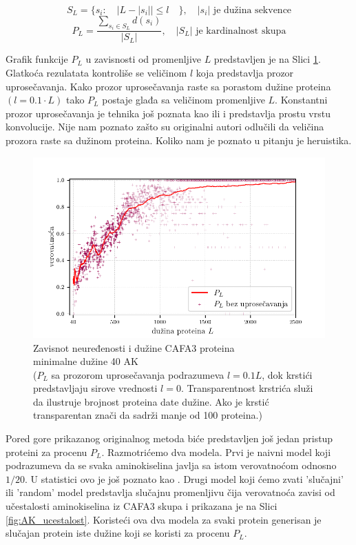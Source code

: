 $$ S_L = \{s_i : \quad | L -  | s_i | | \le l \quad \}, \quad   |s_i| \text{ je dužina sekvence}  $$
$$ P_L = \dfrac{ \sum_{s_i \in S_L} d(s_i)} {| S_L |}, \quad   |S_L| \text{ je kardinalnost skupa}$$

Grafik funkcije $P_L$ u zavisnosti od promenljive $L$ predstavljen je na Slici
\ref{fig:PL1}.  Glatkoća rezulatata kontroliše se veličinom $l$ koja
predstavlja prozor uprosečavanja. Kako prozor uprosečavanja raste sa porastom
dužine proteina $(l = 0.1 \cdot L)$ tako $P_L$ postaje glađa sa veličinom
promenljive $L$.  Konstantni prozor uprosečavanja je tehnika još poznata
kao  ili  i predstavlja prostu vrstu
konvolucije.  Nije nam poznato  zašto su originalni autori odlučili da veličina
prozora raste sa dužinom proteina. Koliko nam je poznato u pitanju je heruistika.


\begin{figure}[th]
\centering
\includegraphics[]{plots/PL_F}
\caption {
  Zavisnot neuređenosti i dužine CAFA3 proteina \\ minimalne dužine 40 AK
  \\ \footnotesize
  ($P_L$ sa prozorom uprosečavanja podrazumeva $l = 0.1L$, dok
  krstići predstavljaju sirove vrednosti $l = 0$. Transparentnost krstrića
  služi da ilustruje brojnost proteina date dužine. Ako je krstić transparentan
  znači da sadrži manje od 100 proteina.)
}
\label{fig:PL1}
\end{figure}


Pored gore prikazanog originalnog metoda biće predstavljen još jedan pristup
  proteini za procenu $P_L$.
Razmotrićemo dva modela. Prvi je naivni model 
koji podrazumeva da se svaka aminokiselina javlja sa istom verovatnoćom odnosno
$1/20$. U statistici ovo je još poznato kao .  Drugi
model koji ćemo zvati 'slučajni' ili 'random' model predstavlja slučajnu
promenljivu čija verovatnoća zavisi od učestalosti aminokiselina iz CAFA3 skupa
i prikazana je na Slici \ref{fig:AK_ucestalost}.  Koristeći ova dva modela za
svaki protein generisan je slučajan protein iste dužine koji se koristi za
procenu $P_L$.


